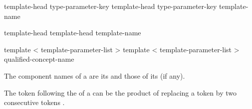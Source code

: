 \documentclass{wg21}
\begin{document}
\begin{addedblock}

\begin{bnf}
\br
template-head type-parameter-key  \br
template-head type-parameter-key  \terminal{=}  template-name
\end{bnf}

\begin{bnf}
    \br
    template-head   \br
    template-head   \terminal{=}  template-name
\end{bnf}

\begin{bnf}
    \br
    template < template-parameter-list >   \br
    template < template-parameter-list >   \terminal{=} qualified-concept-name
\end{bnf}

\end{addedblock}

%
The component names of a  are
its  and
those of its  (if any).

\begin{note}
    The \tcode{>} token following the
     of a
    can be the product of replacing a
    \tcode{>>} token by two consecutive \tcode{>}
    tokens .
\end{note}
\end{document}
